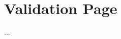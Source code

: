 
\begingroup
\let\clearpage\relax
\let\cleardoublepage\relax

\chapter{Validation Page}
\label{chapter:sig-validation}

...

\endgroup

